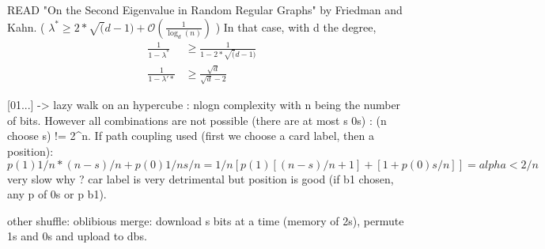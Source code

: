 \documentclass[conference]{IEEEtran}
\begin{document}
READ "On the Second Eigenvalue in Random Regular Graphs" by Friedman and Kahn. ( $\lambda^* \geq 2*\sqrt(d-1) + \mathcal{O}\left( \frac{1}{\log_d(n)} \right)$ )
In that case, with d the degree,
\begin{align}
\frac{1}{1-\lambda^*} &\geq \frac{1}{1-2*\sqrt(d-1)}& \\
\frac{1}{1-\lambda'*} &\geq \frac{\sqrt{d}}{\sqrt{d}-2}
\end{align}


[01...] -> lazy walk on an hypercube : nlogn complexity with n being the number of bits.
However all combinations are not possible (there are at most s 0s) : (n choose s) != 2^n.
If path coupling used (first we choose a card label, then a position): $p(1) 1/n * (n-s)/n + p(0) 1/n s/n = 1/n [p(1) [(n-s)/n+1] + [1+p(0) s/n]] = alpha < 2/n$ very slow 
why ? car label is very detrimental but position is good (if b1 chosen, any p of 0s or p b1).

other shuffle:
oblibious merge: download s bits at a time (memory of 2s), permute 1s and 0s and upload to dbs.
\fi
\end{document}
